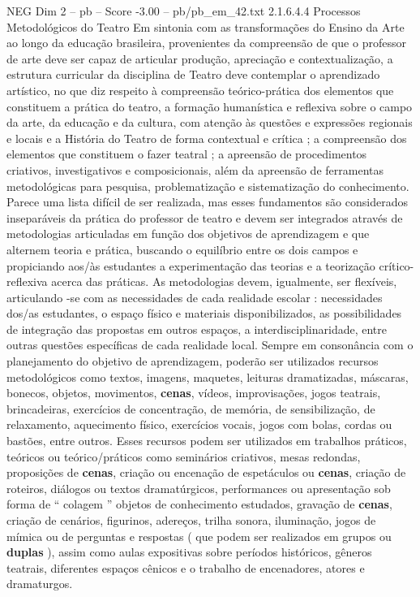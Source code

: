 \begin{textsample}{NEG Dim 2 – pb – Score -3.00 – pb/pb\_em\_42.txt}  \label{ex:f2_neg_005}
2.1.6.4.4 Processos Metodológicos do Teatro Em sintonia com as transformações do Ensino da Arte ao longo da educação brasileira, provenientes da compreensão de que o professor de arte deve ser capaz de articular produção, apreciação e contextualização, a estrutura curricular da disciplina de Teatro deve contemplar o aprendizado artístico, no que diz respeito à compreensão teórico-prática dos elementos que constituem a prática do teatro, a formação humanística e reflexiva sobre o campo da arte, da educação e da cultura, com atenção às questões e expressões regionais e locais e a História do Teatro de forma contextual e crítica ; a compreensão dos elementos que constituem o fazer teatral ; a apreensão de procedimentos criativos, investigativos e composicionais, além da apreensão de ferramentas metodológicas para pesquisa, problematização e sistematização do conhecimento.
Parece uma lista difícil de ser realizada, mas esses fundamentos são considerados inseparáveis da prática do professor de teatro e devem ser integrados através de metodologias articuladas em função dos objetivos de aprendizagem e que alternem teoria e prática, buscando o equilíbrio entre os dois campos e propiciando aos/às estudantes a experimentação das teorias e a teorização crítico-reflexiva acerca das práticas.
As metodologias devem, igualmente, ser flexíveis, articulando -se com as necessidades de cada realidade escolar : necessidades dos/as estudantes, o espaço físico e materiais disponibilizados, as possibilidades de integração das propostas em outros espaços, a interdisciplinaridade, entre outras questões específicas de cada realidade local.
Sempre em consonância com o planejamento do objetivo de aprendizagem, poderão ser utilizados recursos metodológicos como textos, imagens, maquetes, leituras dramatizadas, máscaras, bonecos, objetos, movimentos, \textbf{cenas}, vídeos, improvisações, jogos teatrais, brincadeiras, exercícios de concentração, de memória, de sensibilização, de relaxamento, aquecimento físico, exercícios vocais, jogos com bolas, cordas ou bastões, entre outros.
Esses recursos podem ser utilizados em trabalhos práticos, teóricos ou teórico/práticos como seminários criativos, mesas redondas, proposições de \textbf{cenas}, criação ou encenação de espetáculos ou \textbf{cenas}, criação de roteiros, diálogos ou textos dramatúrgicos, performances ou apresentação sob forma de “ colagem ” objetos de conhecimento estudados, gravação de \textbf{cenas}, criação de cenários, figurinos, adereços, trilha sonora, iluminação, jogos de mímica ou de perguntas e respostas ( que podem ser realizados em grupos ou \textbf{duplas} ), assim como aulas expositivas sobre períodos históricos, gêneros teatrais, diferentes espaços cênicos e o trabalho de encenadores, atores e dramaturgos.

\end{textsample}
